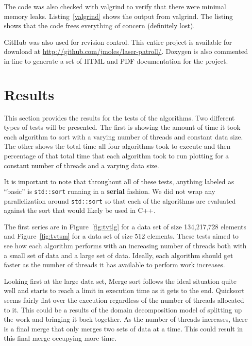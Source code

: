 \documentclass[journal]{IEEEtran}
\newcommand{\bashout}[2]{
\begin{figure}

\end{figure}
}
\begin{document}
The code was also checked with valgrind to verify that there were minimal memory leaks. Listing~\ref{valgrind} shows the output from valgrind. The listing shows that the code frees everything of concern (definitely lost).

\bashout{valgrind}{Valgrind Output}

GitHub was also used for revision control. This entire project is available for download at \url{http://github.com/jmoles/laser-patroll/}. Doxygen is also commented in-line to generate a set of HTML and PDF documentation for the project.



\section{Results}
\label{sec:results}



This section provides the results for the tests of the algorithms. Two different types of tests will be presented. The first is showing the amount of time it took each algorithm to sort with a varying number of threads and constant data size. The other shows the total time all four algorithms took to execute and then percentage of that total time that each algorithm took to run plotting for a constant number of threads and a varying data size.

It is important to note that throughout all of these tests, anything labeled as ``basic'' is \texttt{std::sort} running in a \textbf{serial} fashion. We did not wrap any parallelization around \texttt{std::sort} so that each of the algorithms are evaluated against the sort that would likely be used in C++.

The first series are in Figure~\ref{fig:tvtlg} for a data set of size 134,217,728 elements and Figure~\ref{fig:tvtsm} for a data set of size 512 elements. These tests aimed to see how each algorithm performs with an increasing number of threads both with a small set of data and a large set of data. Ideally, each algorithm should get faster as the number of threads it has available to perform work increases.

Looking first at the large data set, Merge sort follows the ideal situation quite well and starts to reach a limit in execution time as it gets to the end. Quicksort seems fairly flat over the execution regardless of the number of threads allocated to it. This could be a results of the domain decomposition model of splitting up the work and bringing it back together. As the number of threads increases, there is a final merge that only merges two sets of data at a time. This could result in this final merge occupying more time. 
\end{document}
